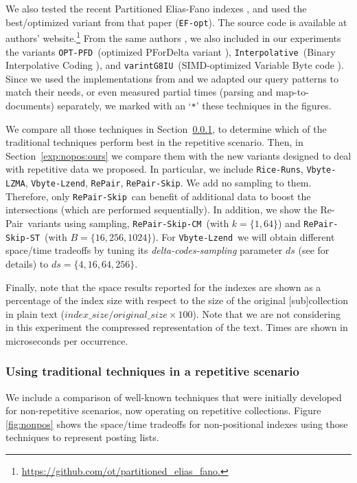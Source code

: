 \documentclass[review]{elsarticle}
\newcommand{\repair}{Re-Pair}
\newcommand{\riceRuns}{\texttt{Rice-Runs}}
\newcommand{\repairNo}{\texttt{RePair}}
\newcommand{\repairSkip}{\texttt{RePair-Skip}}
\newcommand{\repairSkipCM}{\texttt{RePair-Skip-CM}}
\newcommand{\repairSkipST}{\texttt{RePair-Skip-ST}}
\newcommand{\vbyteLZMA}{\texttt{Vbyte-LZMA}}
\newcommand{\vbyteLzend}{\texttt{Vbyte-Lzend}}
\newcommand{\interpolative}{\texttt{Interpolative}}
\newcommand{\efopt}{\texttt{EF-opt}}
\newcommand{\optpfd}{\texttt{OPT-PFD}}
\newcommand{\varint}{\texttt{varintG8IU}}
\begin{document}
We also tested the recent Partitioned Elias-Fano indexes \cite{OV14}, and used the best/optimized variant from that paper (\efopt). The source code is available at authors' website.\footnote{\url{https://github.com/ot/partitioned_elias_fano.}}
From  the same authors \cite{OV14}, we also included in our experiments the variants \optpfd\ (optimized PForDelta variant \cite{YDS09}), \interpolative\ (Binary Interpolative Coding \cite{MS00}), and \varint\ (SIMD-optimized Variable Byte code \cite{Stepanov:2011}). Since we used the implementations from \cite{OV14} and we adapted our query patterns to match their needs, or even measured partial times (parsing and map-to-documents) separately, we marked with an `\texttt{*}' these techniques in the figures. 



We compare all those techniques in Section~\ref{exp:nopos:others}, to determine which of the traditional techniques perform best in the repetitive scenario. 
Then, in Section~\ref{exp:nopos:ours} we compare them with the new variants designed to deal with repetitive data we proposed. In particular, we include \riceRuns,
\vbyteLZMA,  \vbyteLzend, \repairNo, \repairSkip. We add no sampling to them. Therefore, only \repairSkip\ can benefit of additional data to boost the intersections (which are performed sequentially). In addition, we show the \repair\ variants using sampling, \repairSkipCM\ (with $k=\{1,64\}$) and \repairSkipST\ (with $B=\{16, 256, 1024\}$). For \vbyteLzend\ we will obtain different space/time tradeoffs by tuning its {\em delta-codes-sampling} parameter $ds$ (see \cite{KNtcs12} for details) to $ds=\{4,16,64,256\}$.

Finally, note that the space results reported for the indexes are shown as a percentage 
of the index size with respect to the size of the original [sub]collection in plain text
($index\_size / original\_size \times 100$). Note that we are not considering in
this experiment the compressed representation of the text. 
Times are shown in microseconds per occurrence.



\subsubsection{Using traditional techniques in a repetitive scenario} \label{exp:nopos:others}

We include a comparison of well-known techniques that were initially developed
for non-repetitive scenarios, now operating on repetitive collections.
Figure \ref{fig:nonpos} shows the space/time tradeoffs for 
non-positional indexes using those techniques to represent posting lists. 
\end{document}
